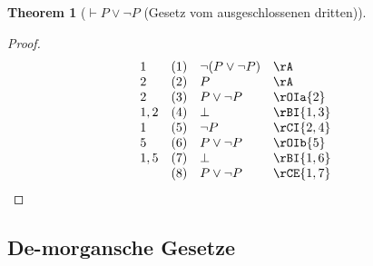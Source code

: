 \documentclass{book}
\theoremstyle{plain}
\newtheorem{theorem}{Theorem}
\theoremstyle{remark}
\theoremstyle{definition}
\begin{document}
\label{ImpPOrnP}
\begin{theorem}[\(\vdash P \lor \neg P\) (Gesetz vom ausgeschlossenen dritten)]
\end{theorem}
\begin{proof}
	\[
	\begin{array}{llll}
		1 & (1) & \neg(P \lor \neg P) & \rA \\
		2 & (2) & P & \rA \\
		2 & (3) & P \lor \neg P & \rOIa{2} \\
		1,2 & (4) & \bot & \rBI{1,3} \\
		1 & (5) & \neg P & \rCI{2,4} \\
		5 & (6) & P \lor \neg P & \rOIb{5}\\
		1,5 & (7) & \bot & \rBI{1,6} \\
		& (8) & P \lor \neg P & \rCE{1,7} \\
	\end{array}
	\]
\end{proof}

\subsection{De-morgansche Gesetze}
\end{document}
